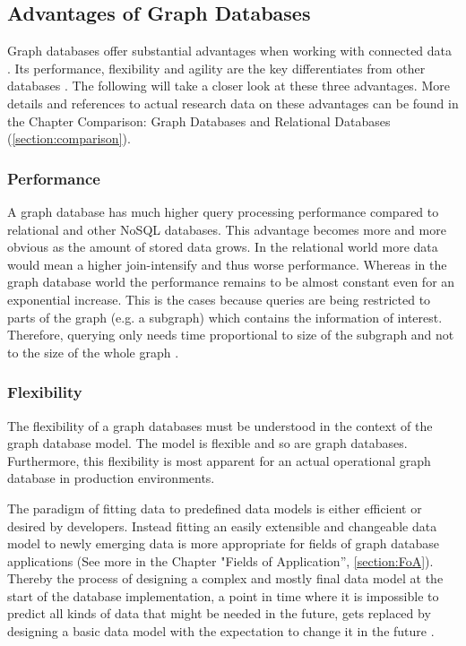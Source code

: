 \subsection{Advantages of Graph Databases}
Graph databases offer substantial advantages when working with connected data \autocite{maheshlal2015}. Its performance, flexibility and agility are the key differentiates from other databases \autocite{graphdb2015}. The following will take a closer look at these three advantages. More details and references to actual research data on these advantages can be found in the Chapter Comparison: Graph Databases and Relational Databases (\ref{section:comparison}).

\subsubsection{Performance}
A graph database has much higher query processing performance compared to relational and other NoSQL databases. This advantage becomes more and more obvious as the amount of stored data grows. In the relational world more data would mean a higher join-intensify and thus worse performance. Whereas in the graph database world the performance remains to be almost constant even for an exponential increase. This is the cases because queries are being restricted to parts of the graph (e.g. a subgraph) which contains the information of interest.  Therefore, querying only needs time proportional to size of the subgraph and not to the size of the whole graph \autocite{maheshlal2015, graphdb2015}.

\subsubsection{Flexibility}
The flexibility of a graph databases must be understood in the context of the graph database model. The model is flexible and so are graph databases. Furthermore, this flexibility is most apparent for an actual operational graph database in production environments.

The paradigm of fitting data to predefined data models is either efficient or desired by developers. Instead fitting an easily extensible and changeable data model to newly emerging data is more appropriate for fields of graph database applications (See more in the Chapter "Fields of Application”, \ref{section:FoA}). Thereby the process of designing a complex and mostly final data model at the start of the database implementation, a point in time where it is impossible to predict all kinds of data that might be needed in the future, gets replaced by designing a basic data model with the expectation to change it in the future \autocite{maheshlal2015, graphdb2015}.

